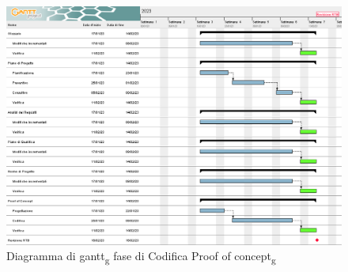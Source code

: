 \begin{figure}[H]
    \centering
    \includegraphics[scale=0.56]{image/gantt_terzo_periodo.png}
    \caption{Diagramma di gantt\textsubscript{g} fase di Codifica Proof of concept\textsubscript{g}}
\end{figure}
\pagebreak